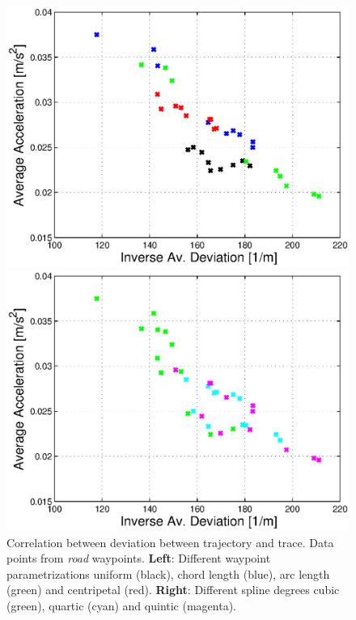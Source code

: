 \begin{figure}[H]
  \begin{minipage}[t]{0.48\textwidth}
    \includegraphics[width = \textwidth]{correlation/Control_Correlation_InvDev_Acc_Parametrization}
  \end{minipage}
  \hfill
  \begin{minipage}[t]{0.48\textwidth}
    \includegraphics[width = \textwidth]{correlation/Control_Correlation_InvDev_Acc_SplineDegree}
  \end{minipage}
  \caption{Correlation between deviation between trajectory and trace. Data points from \textit{road} waypoints. {\bf Left}: Different waypoint parametrizations uniform (black), chord length (blue), arc length (green) and centripetal (red). {\bf Right}: Different spline degrees cubic (green), quartic (cyan) and quintic (magenta).}
  \label{fig:correlation_invdev_acc}
\end{figure}


